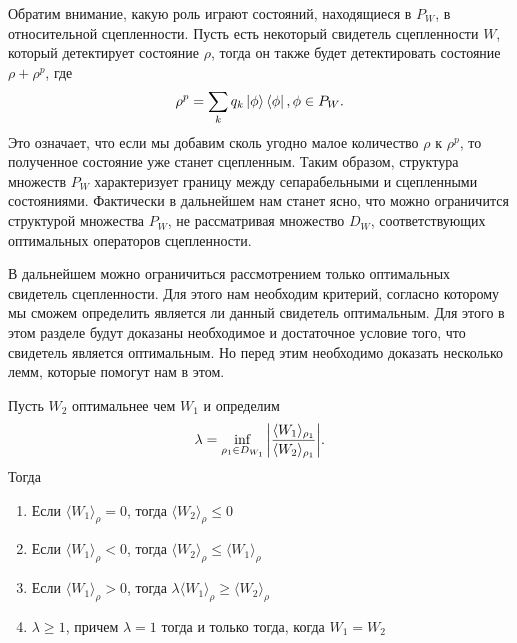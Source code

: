 Обратим внимание, какую роль играют состояний, находящиеся в $P_W$, в относительной сцепленности. Пусть есть некоторый свидетель сцепленности $W$, который детектирует состояние $\rho$, тогда он также будет детектировать состояние $\rho + \rho^{p}$, где
\begin{equation}
    \rho^{p} = \sum\limits_{k} q_k \ket{\phi}
    \bra{\phi}, \phi \in P_W.
\end{equation}
Это означает, что если мы добавим сколь угодно малое количество $\rho$ к $\rho^{p}$, то полученное состояние уже станет сцепленным. Таким образом, структура множеств $P_W$ характеризует границу между сепарабельными и сцепленными состояниями. Фактически в дальнейшем нам станет ясно, что можно ограничится структурой множества $P_W$, не рассматривая множество $D_W$, соответствующих оптимальных операторов сцепленности.


В дальнейшем можно ограничиться рассмотрением только оптимальных свидетель сцепленности. Для этого нам необходим критерий, согласно которому мы сможем определить является ли данный свидетель оптимальным. Для этого в этом разделе будут доказаны необходимое и достаточное условие того, что свидетель является оптимальным. Но перед этим необходимо доказать несколько лемм, которые помогут нам в этом. 

\begin{lemma}
Пусть $W_2$ оптимальнее чем $W_1$ и определим
\begin{equation}\label{lambda-lemma}
    \lambda = \inf_{\rho_1 \in D_{W_1}} \abs{\frac{\langle W_1 \rangle_{\rho_1}}{\langle W_2 \rangle_{\rho_1}}}.
\end{equation}
Тогда
\begin{enumerate}
    \item Если $\langle W_1 \rangle_{\rho} = 0$, тогда $\langle W_2 \rangle_{\rho} \leq 0$

    \item Если $\langle W_1 \rangle_{\rho} < 0$, тогда $\langle W_2 \rangle_{\rho} \leq \langle W_1 \rangle_{\rho}$

    \item Если $\langle W_1 \rangle_{\rho} > 0$, тогда $\lambda \langle W_1 \rangle_{\rho} \geq \langle W_2 \rangle_{\rho}$

    \item $\lambda \geq 1$, причем $\lambda = 1$ тогда и только тогда, когда $W_1 = W_2$
\end{enumerate}
\end{lemma}

